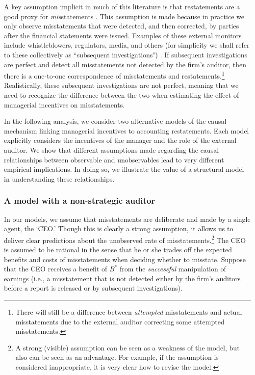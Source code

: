 A key assumption implicit in much of this literature is that restatements are a good proxy for \emph{mis}statements \citep[e.g.,][]{Efendi:2007ja,Armstrong:2010jd}. 
This assumption is made because in practice we only observe misstatements that were detected, and then corrected, by parties after the financial statements were issued. 
Examples of these external monitors include whistleblowers, regulators, media, and others (for simplicity we shall refer to these collectively as ``subsequent investigations") \citep{Dyck:2010kh}.
If subsequent investigations are perfect and detect all misstatements not detected by the firm's auditor, then there is a one-to-one correspondence of misstatements and restatements.\footnote{There will still be a difference between \emph{attempted} misstatements and actual misstatements due to the external auditor correcting some attempted misstatements.}
Realistically, these subsequent investigations are not perfect, meaning that we need to recognize the difference between the two when estimating the effect of managerial incentives on misstatements.

In the following analysis, we consider two alternative models of the causal mechanism linking managerial incentives to accounting restatements.
Each model explicitly considers the incentives of the manager and the role of the external auditor. 
We show that different assumptions made regarding the causal relationships between observable and unobservables lead to very different empirical implications.
In doing so, we illustrate the value of a structural model in understanding these relationships.

\subsubsection{A model with a non-strategic auditor}
In our models, we assume that misstatements  are deliberate and made by a single agent, the `CEO.'
Though this is clearly a strong assumption, it allows us to deliver clear predictions about the unobserved rate of misstatements.\footnote{
A strong (visible) assumption can be seen as a weakness of the model, but also can be seen as an advantage.  For example, if the assumption is considered inappropriate, it is very clear how to revise the model.} 
The CEO is assumed to be rational in the sense that he or she trades off the expected benefits and costs of misstatements when deciding whether to misstate.
Suppose that the CEO receives a benefit of $B^*$ from the \emph{successful} manipulation of earnings (i.e., a misstatement that is not detected either by the firm's auditors before a report is released or by subsequent investigations). 

